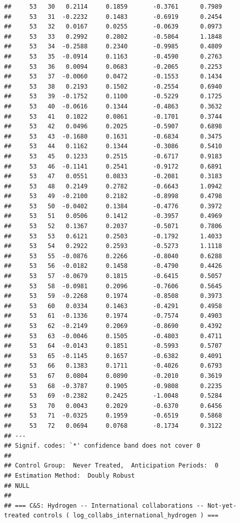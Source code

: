 \documentclass[
]{article}
\begin{document}
\begin{verbatim}
##     53   30   0.2114     0.1859       -0.3761      0.7989  
##     53   31  -0.2232     0.1483       -0.6919      0.2454  
##     53   32   0.0167     0.0255       -0.0639      0.0973  
##     53   33   0.2992     0.2802       -0.5864      1.1848  
##     53   34  -0.2588     0.2340       -0.9985      0.4809  
##     53   35  -0.0914     0.1163       -0.4590      0.2763  
##     53   36   0.0094     0.0683       -0.2065      0.2253  
##     53   37  -0.0060     0.0472       -0.1553      0.1434  
##     53   38   0.2193     0.1502       -0.2554      0.6940  
##     53   39  -0.1752     0.1100       -0.5229      0.1725  
##     53   40  -0.0616     0.1344       -0.4863      0.3632  
##     53   41   0.1022     0.0861       -0.1701      0.3744  
##     53   42   0.0496     0.2025       -0.5907      0.6898  
##     53   43  -0.1680     0.1631       -0.6834      0.3475  
##     53   44   0.1162     0.1344       -0.3086      0.5410  
##     53   45   0.1233     0.2515       -0.6717      0.9183  
##     53   46  -0.1141     0.2541       -0.9172      0.6891  
##     53   47   0.0551     0.0833       -0.2081      0.3183  
##     53   48   0.2149     0.2782       -0.6643      1.0942  
##     53   49  -0.2100     0.2182       -0.8998      0.4798  
##     53   50  -0.0402     0.1384       -0.4776      0.3972  
##     53   51   0.0506     0.1412       -0.3957      0.4969  
##     53   52   0.1367     0.2037       -0.5071      0.7806  
##     53   53   0.6121     0.2503       -0.1792      1.4033  
##     53   54   0.2922     0.2593       -0.5273      1.1118  
##     53   55  -0.0876     0.2266       -0.8040      0.6288  
##     53   56  -0.0182     0.1458       -0.4790      0.4426  
##     53   57  -0.0679     0.1815       -0.6415      0.5057  
##     53   58  -0.0981     0.2096       -0.7606      0.5645  
##     53   59  -0.2268     0.1974       -0.8508      0.3973  
##     53   60   0.0334     0.1463       -0.4291      0.4958  
##     53   61  -0.1336     0.1974       -0.7574      0.4903  
##     53   62  -0.2149     0.2069       -0.8690      0.4392  
##     53   63  -0.0046     0.1505       -0.4803      0.4711  
##     53   64  -0.0143     0.1851       -0.5993      0.5707  
##     53   65  -0.1145     0.1657       -0.6382      0.4091  
##     53   66   0.1383     0.1711       -0.4026      0.6793  
##     53   67   0.0804     0.0890       -0.2010      0.3619  
##     53   68  -0.3787     0.1905       -0.9808      0.2235  
##     53   69  -0.2382     0.2425       -1.0048      0.5284  
##     53   70   0.0043     0.2029       -0.6370      0.6456  
##     53   71  -0.0325     0.1959       -0.6519      0.5868  
##     53   72   0.0694     0.0768       -0.1734      0.3122  
## ---
## Signif. codes: `*' confidence band does not cover 0
## 
## Control Group:  Never Treated,  Anticipation Periods:  0
## Estimation Method:  Doubly Robust
## NULL
## 
## === C&S: Hydrogen -- International collaborations -- Not-yet-treated controls ( log_collabs_international_hydrogen ) ===
\end{verbatim}
\end{document}
